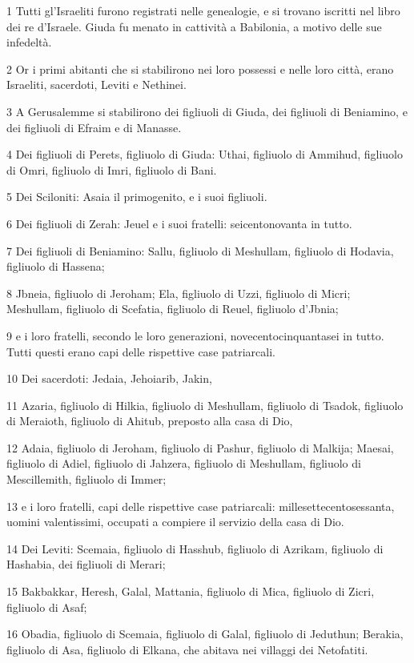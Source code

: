 \par 1 Tutti gl'Israeliti furono registrati nelle genealogie, e si trovano iscritti nel libro dei re d'Israele. Giuda fu menato in cattività a Babilonia, a motivo delle sue infedeltà.
\par 2 Or i primi abitanti che si stabilirono nei loro possessi e nelle loro città, erano Israeliti, sacerdoti, Leviti e Nethinei.
\par 3 A Gerusalemme si stabilirono dei figliuoli di Giuda, dei figliuoli di Beniamino, e dei figliuoli di Efraim e di Manasse.
\par 4 Dei figliuoli di Perets, figliuolo di Giuda: Uthai, figliuolo di Ammihud, figliuolo di Omri, figliuolo di Imri, figliuolo di Bani.
\par 5 Dei Sciloniti: Asaia il primogenito, e i suoi figliuoli.
\par 6 Dei figliuoli di Zerah: Jeuel e i suoi fratelli: seicentonovanta in tutto.
\par 7 Dei figliuoli di Beniamino: Sallu, figliuolo di Meshullam, figliuolo di Hodavia, figliuolo di Hassena;
\par 8 Jbneia, figliuolo di Jeroham; Ela, figliuolo di Uzzi, figliuolo di Micri; Meshullam, figliuolo di Scefatia, figliuolo di Reuel, figliuolo d'Jbnia;
\par 9 e i loro fratelli, secondo le loro generazioni, novecentocinquantasei in tutto. Tutti questi erano capi delle rispettive case patriarcali.
\par 10 Dei sacerdoti: Jedaia, Jehoiarib, Jakin,
\par 11 Azaria, figliuolo di Hilkia, figliuolo di Meshullam, figliuolo di Tsadok, figliuolo di Meraioth, figliuolo di Ahitub, preposto alla casa di Dio,
\par 12 Adaia, figliuolo di Jeroham, figliuolo di Pashur, figliuolo di Malkija; Maesai, figliuolo di Adiel, figliuolo di Jahzera, figliuolo di Meshullam, figliuolo di Mescillemith, figliuolo di Immer;
\par 13 e i loro fratelli, capi delle rispettive case patriarcali: millesettecentosessanta, uomini valentissimi, occupati a compiere il servizio della casa di Dio.
\par 14 Dei Leviti: Scemaia, figliuolo di Hasshub, figliuolo di Azrikam, figliuolo di Hashabia, dei figliuoli di Merari;
\par 15 Bakbakkar, Heresh, Galal, Mattania, figliuolo di Mica, figliuolo di Zicri, figliuolo di Asaf;
\par 16 Obadia, figliuolo di Scemaia, figliuolo di Galal, figliuolo di Jeduthun; Berakia, figliuolo di Asa, figliuolo di Elkana, che abitava nei villaggi dei Netofatiti.
